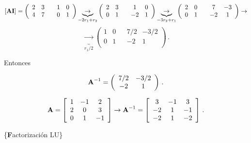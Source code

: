 \documentclass[
]{agujournal2019}
\begin{document}
\[[{\textbf A}  {\textbf I}]=
  \left(
        \begin{array}{ccccc}
  2 & 3 & & 1 & 0\\
  4 & 7 & & 0 & 1\\
        \end{array}
  \right)
  \underbrace{\rightarrow}_{-2r_1+r_2}
  \left(
        \begin{array}{ccccc}
  2 & 3 & & 1 & 0\\
  0 & 1 & & -2 & 1\\
        \end{array}
  \right)
  \underbrace{\rightarrow}_{-3r_2+r_1}
  \left(
        \begin{array}{ccccc}
  2 & 0 & & 7 & -3\\
  0 & 1 & & -2 & 1\\
        \end{array}
  \right)\rightarrow\] \[\underbrace{\rightarrow}_{r_1/2}
  \left(
        \begin{array}{ccccc}
  1 & 0 & & 7/2 & -3/2\\
  0 & 1 & & -2 & 1\\
        \end{array}
  \right)
  \,.
  \]

Entonces

\[{\textbf A}^{-1}=\left(
        \begin{array}{ccccc}
  7/2 & -3/2\\
  -2 & 1\\
        \end{array}
  \right)\,.\]

 \[{\textbf A}=\left[\begin{array}{cccc}
  1 & -1 & 2\\
  2 & 0 & 3\\
  0 & 1 & -1\\
\end{array}\right]\rightarrow
{\textbf A}^{-1}=\left[\begin{array}{cccc}
  3 & -1 & 3\\
  -2 & 1 & -1\\
  -2 & 1 & -2\\
\end{array}\right]\,.\]

\vspace{0.5cm}

\{\noindent \textbf Factorización LU\}
\end{document}
